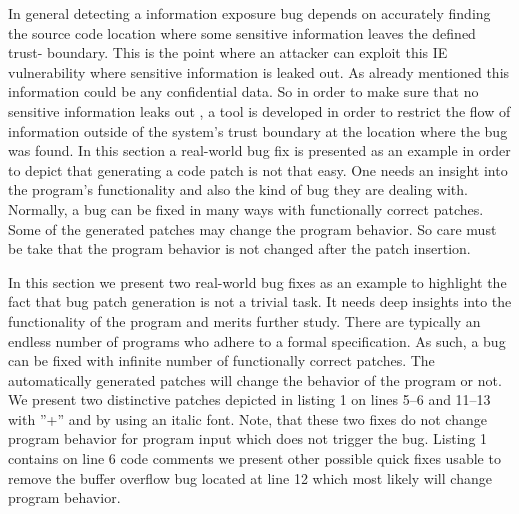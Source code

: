  
 In general detecting a information exposure bug depends on accurately finding the source code location
 where some sensitive information leaves the defined trust- boundary. This is the point where an attacker can exploit this IE vulnerability
 where sensitive information is leaked out. As already mentioned this information could be any confidential data. So in order to make sure that
 no sensitive information leaks out , a tool is developed in order to restrict the flow of information outside of the system's trust boundary at the location where the bug
 was found. In this section a real-world bug fix is presented as an example in order to depict that generating a code patch is not that easy.
 One needs an insight into the program's functionality and also the kind of bug they are dealing with. Normally, a bug can be fixed in many ways with functionally correct patches.
 Some of the generated patches may change the program behavior. So care must be take that the program behavior is not changed after the patch insertion.
 
 
 
 
 
 In this section we present two real-world bug fixes as an example to highlight the
fact that bug patch generation is not a trivial task. It needs deep insights into
the functionality of the program and merits further study. There are typically
an endless number of programs who adhere to a formal specification. As such,
a bug can be fixed with infinite number of functionally correct patches. The
automatically generated patches will change the behavior of the program or not.
We present two distinctive patches depicted in listing 1 on lines 5–6 and 11–13
with ”+” and by using an italic font. Note, that these two fixes do not change
program behavior for program input which does not trigger the bug. Listing 1
contains on line 6 code comments we present other possible quick fixes usable to
remove the buffer overflow bug located at line 12 which most likely will change
program behavior.



